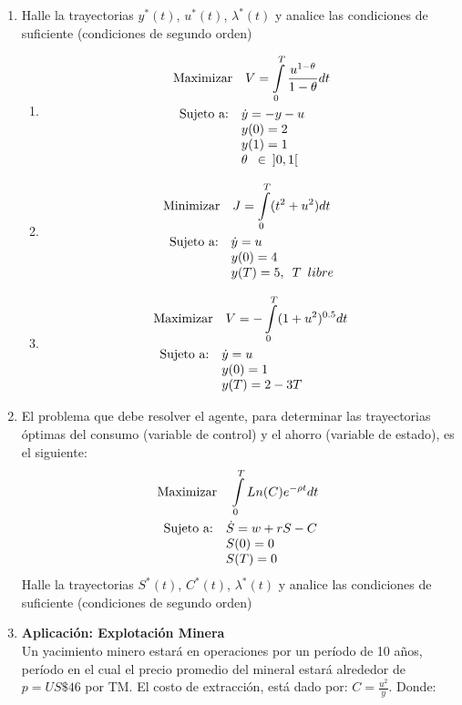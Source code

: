 \documentclass[10pt,a4paper]{article}
\begin{document}
\begin{enumerate}
				\item Halle la trayectorias $y^*(t)$, $u^*(t)$, $\lambda ^*(t)$ y analice las condiciones de suficiente (condiciones de segundo orden)
		\begin{enumerate}
			\item	\begin{align*}
				&\textup{Maximizar}\quad V = \int\limits_{0}^{T}\frac{u^{1-\theta}}{1-\theta}dt\\
				&\begin{array}{lllll}
					\textup{Sujeto a:}	&	\dot{y}=-y-u \\
					&	y(0)=2 \\
					&   y(1)=1 \\
					&   \theta \enskip \in \enskip ]0,1[ 
				\end{array}
			\end{align*}
			\item 
			\begin{align*}
				&\textup{Minimizar}\quad J = \int\limits_{0}^{T}(t^2+u^2)dt\\
				&\begin{array}{lllll}
					\textup{Sujeto a:}	&	\dot{y}=u \\
					&	y(0)=4 \\
					&   y(T)=5,\enskip T \enskip libre
				\end{array}
			\end{align*}
			\item 
			\begin{align*}
				&\textup{Maximizar}\quad V = -\int\limits_{0}^{T}(1+u^2)^{0.5}dt\\
				&\begin{array}{lllll}
					\textup{Sujeto a:}	&	\dot{y}=u \\
					&	y(0)=1 \\
					&   y(T)= 2- 3T
				\end{array}
			\end{align*}
		\end{enumerate}	
		\item El problema que debe resolver el agente, para determinar las trayectorias óptimas
		del consumo (variable de control) y el ahorro (variable de estado), es el
		siguiente:
		\begin{align*}
			&\textup{Maximizar}\quad \int\limits_{0}^{T}Ln(C)e^{-\rho t}dt\\
			&\begin{array}{lllll}
				\textup{Sujeto a:}	&	\dot{S}=w+rS-C \\
				&	S(0)=0 \\
				&	S(T)=0
			\end{array}
		\end{align*}
		Halle la trayectorias $S^*(t)$, $C^*(t)$, $\lambda ^*(t)$ y analice las condiciones de suficiente (condiciones de segundo orden)
		\item \textbf{Aplicación: Explotación Minera}\\
		Un yacimiento minero estará en operaciones por un período de 10 años, período en el cual el precio promedio del mineral estará alrededor de $p=US\$ 46$ por TM.  El costo de extracción, está dado por: $C=\frac{u^2}{y}$. Donde:\
		

\end{enumerate}
\end{document}

